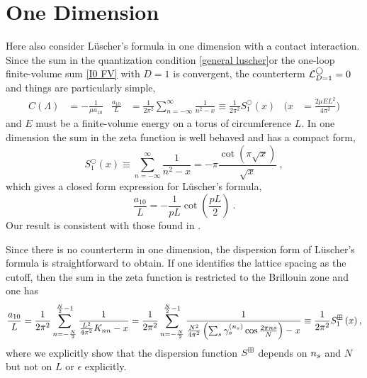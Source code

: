 \section{One Dimension}\label{sec:1D}

Here also consider L\"uscher's formula in one dimension with a contact interaction.
Since the sum in the quantization condition \eqref{general luscher}or the one-loop finite-volume sum \eqref{I0 FV} with $D=1$ is convergent, the counterterm $\mathcal{L}_{D=1}^\bigcirc=0$ and things are particularly simple,
\begin{align}
    C(\Lambda)
        &=
            -\frac{1}{\mu a_{10}}
    &
    \frac{a_{10}}{L}
        &=
            \frac{1}{2 \pi^{2}}
            \sum_{n=-\infty}^{\infty} \frac{1}{n^{2}-x}
        \equiv
            \frac{1}{2 \pi^{2}}
            S^\bigcirc_{1}\left(x\right)
    &
    \Bigg(x
        &=
            \frac{2\mu E L^2}{4\pi^2}\Bigg)
\end{align}
and $E$ must be a finite-volume energy on a torus of circumference $L$.
In one dimension the sum in the zeta function is well behaved and has a compact form,
\begin{equation}\label{eq:1d luscher}
S^\bigcirc_{1}(x) \equiv \sum_{n=-\infty}^{\infty} \frac{1}{n^{2}-x}=-\pi \frac{\cot (\pi \sqrt{x})}{\sqrt{x}}\ ,
\end{equation}
which gives a closed form expression for L\"uscher's formula,
\begin{equation}\label{eq:1d luscher}
\frac{a_{10}}{L} =-\frac{1}{pL}\cot\left(\frac{pL}{2}\right)\ .
\end{equation}
Our result is consistent with those found in \cite{}.

Since there is no counterterm in one dimension, the dispersion form of L\"uscher's formula is straightforward to obtain.  If one identifies the lattice spacing as the cutoff, then the sum in the zeta function is restricted to the Brillouin zone and one has
\begin{equation}
    \frac{a_{10}}{L}
    =
    \frac{1}{2 \pi^{2}} \sum_{n=-\frac{N}{2}}^{\frac{N}{2}-1} \frac{1}{\frac{L^2}{4\pi^2}K_{nn}-x}
    =
    \frac{1}{2 \pi^{2}} \sum_{n=-\frac{N}{2}}^{\frac{N}{2}-1} \frac{1}{\frac{N^2}{4\pi^2}\left(\sum_{s}\gamma_s^{({n_s})}\cos\frac{2\pi n s}{N}\right)-x}
    \equiv
    \frac{1}{2 \pi^{2}} S^{\boxplus}_{1}\left(x\right),\label{eq:1d dispersion luscher}
\end{equation}
where we explicitly show that the dispersion function $S^{\boxplus}$ depends on ${n_s}$ and $N$ but not on $L$ or $\epsilon$ explicitly.


